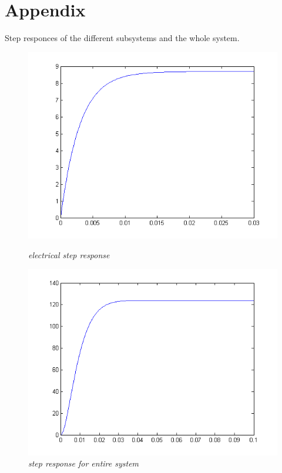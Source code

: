 \documentclass[12pt,a4paper]{article}
\begin{document}
\section{Appendix}
\label{App:appendix}
Step responces of the different subsystems and the whole system.
\begin{figure}[h!]
\begin{minipage}{.5\linewidth}
\centering
  \includegraphics[width=1\linewidth]{electricalsim.png}
  \caption{\emph{electrical step response}}
  \label{fig:electrical}
\end{minipage}
\begin{minipage}{.5\linewidth}
  \centering
  \includegraphics[width=1\linewidth]{fullsim.png}
  \caption{\emph{step response for entire system}}
  \label{fig:entire}
\end{minipage}
\end{figure}
\end{document}
